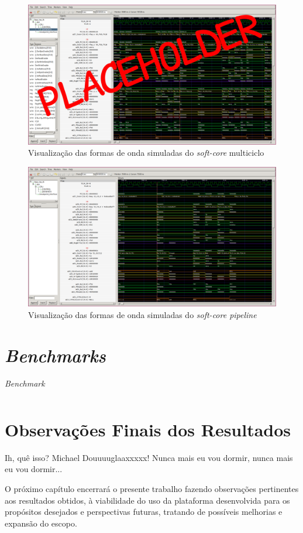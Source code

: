     \begin{figure}[H]
    \centering
        \includegraphics[width=0.9\linewidth]{../images/gtkwave/gtkwave_multi.png}
        \caption{Visualização das formas de onda simuladas do \textit{soft-core} multiciclo}
        \label{fig:gtkwave_multi}
    \end{figure}

    \begin{figure}[H]
    \centering
        \includegraphics[width=0.9\linewidth]{../images/gtkwave/gtkwave_pipe.png}
        \caption{Visualização das formas de onda simuladas do \textit{soft-core pipeline}}
        \label{fig:gtkwave_pipe}
    \end{figure}

\section{\textit{Benchmarks}}
    {
    }
    \begin{longtable}{|l|}
        \caption{\textit{Benchmark}}\label{table:benchmark}\\
        \hline
        \hline
        \endfirsthead
        \hline
        \hline
        \endhead
        \hline
    \end{longtable}

\section{Observações Finais dos Resultados}
    { Ih, quê isso? Michael Douuuuglaaxxxxx! Nunca mais eu vou dormir, nunca mais
        eu vou dormir...
    } %

    { O próximo capítulo encerrará o presente trabalho fazendo observações
        pertinentes aos resultados obtidos, à viabilidade do uso da plataforma
        desenvolvida para os propósitos desejados e perspectivas futuras,
        tratando de possíveis melhorias e expansão do escopo.
    }

